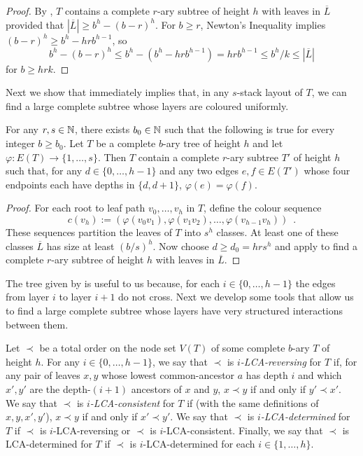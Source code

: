 \documentclass[kpfonts]{patmorin}
\begin{document}
\begin{proof}
  By , $T$ contains a complete $r$-ary subtree of height $h$ with leaves in $\overline{L}$ provided that $|\overline{L}|\ge b^h-(b-r)^h$.  For $b\ge r$, Newton's Inequality implies $(b-r)^h\ge b^h-hrb^{h-1}$, so
  \[  b^h-(b-r)^h \le b^h-(b^h - hrb^{h-1}) = hrb^{h-1} \le b^h/k \le |\overline{L}| \]
  for $b \ge hrk$.
\end{proof}


Next we show that  immediately implies that, in any $s$-stack layout of $T$, we can find a large complete subtree whose layers are coloured uniformly.

\begin{lem}
  For any $r,s\in\mathbb{N}$, there exists $b_0\in\mathbb{N}$ such that the following is true for every integer $b\ge b_0$.  Let $T$ be a complete $b$-ary tree of height $h$ and let $\varphi:E(T)\to\{1,\ldots,s\}$.  Then $T$ contain a complete $r$-ary subtree $T'$ of height $h$ such that, for any $d\in\{0,\ldots,h-1\}$ and any two edges $e,f\in E(T')$ whose four endpoints each have depths in $\{d,d+1\}$, $\varphi(e)=\varphi(f)$. 
\end{lem}

\begin{proof}
  For each root to leaf path $v_0,\ldots,v_h$ in $T$, define the colour sequence
  \[  c(v_h):=(\varphi(v_0v_1),\varphi(v_1v_2),\ldots,\varphi(v_{h-1}v_h)) \enspace .
  \]  
  These sequences partition the leaves of $T$ into $s^h$ classes.  At least one of these classes $\overline{L}$ has size at least $(b/s)^h$.  Now choose $d\ge d_0=hrs^h$ and apply  to find a complete $r$-ary subtree of height $h$ with leaves in $\overline{L}$.
\end{proof}

The tree given by  is useful to us because, for each $i\in\{0,\ldots,h-1\}$ the edges from layer $i$ to layer $i+1$ do not cross. Next we develop some tools that allow us to find a large complete subtree whose layers have very structured interactions between them.

Let $\prec$ be a total order on the node set $V(T)$ of some complete $b$-ary $T$ of height $h$.  For any $i\in\{0,\ldots,h-1\}$, we say that $\prec$ is \emph{$i$-LCA-reversing} for $T$ if, for any pair of leaves $x,y$ whose lowest common-ancestor $a$ has depth $i$ and which $x',y'$ are the depth-$(i+1)$ ancestors of $x$ and $y$, $x\prec y$ if and only if $y'\prec x'$.  We say that $\prec$ is \emph{$i$-LCA-consistent} for $T$ if (with the same definitions of $x,y,x',y'$), $x\prec y$ if and only if $x'\prec y'$.  We say that $\prec$ is \emph{$i$-LCA-determined} for $T$ if $\prec$ is $i$-LCA-reversing or $\prec$ is $i$-LCA-consistent.  Finally, we say that $\prec$ is LCA-determined for $T$ if $\prec$ is $i$-LCA-determined for each $i\in\{1,\ldots,h\}$.
\end{document}
